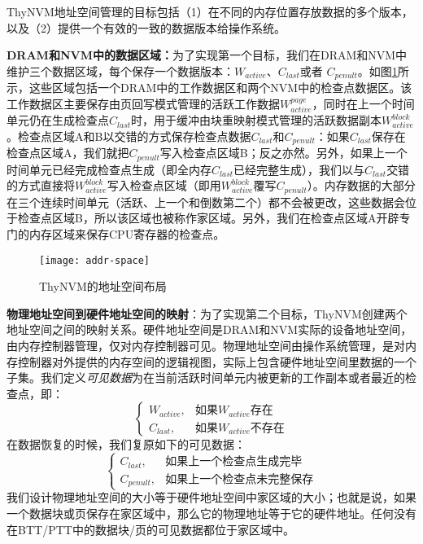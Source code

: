 ThyNVM地址空间管理的目标包括（1）在不同的内存位置存放数据的多个版本，以及（2）提供一个有效的一致的数据版本给操作系统。

\textbf{DRAM和NVM中的数据区域：}为了实现第一个目标，我们在DRAM和NVM中维护三个数据区域，每个保存一个数据版本：$W_{active}$、$C_{last}$或者 $C_{penult}$。如图\ref{fig-addr-space}所示，这些区域包括一个DRAM中的工作数据区和两个NVM中的检查点数据区。该工作数据区主要保存由页回写模式管理的活跃工作数据$W^{page}_{active}$，同时在上一个时间单元仍在生成检查点$C_{last}$时，用于缓冲由块重映射模式管理的活跃数据副本$W^{block}_{active}$。检查点区域A和B以交错的方式保存检查点数据$C_{last}$和$C_{penult}$：如果$C_{last}$保存在检查点区域A，我们就把$C_{penult}$写入检查点区域B；反之亦然。另外，如果上一个时间单元已经完成检查点生成（即全内存$C_{last}$已经完整生成），我们以与$C_{last}$交错的方式直接将$W^{block}_{active}$写入检查点区域（即用$W^{block}_{active}$覆写$C_{penult}$）。内存数据的大部分在三个连续时间单元（活跃、上一个和倒数第二个）都不会被更改，这些数据会位于检查点区域B，所以该区域也被称作家区域。另外，我们在检查点区域A开辟专门的内存区域来保存CPU寄存器的检查点。 

\begin{figure}[!h]
\centering
\texttt{[image: addr-space]}
\caption{ThyNVM的地址空间布局}
\label{fig-addr-space}
\end{figure}

\textbf{物理地址空间到硬件地址空间的映射}：为了实现第二个目标，ThyNVM创建两个地址空间之间的映射关系。硬件地址空间是DRAM和NVM实际的设备地址空间，由内存控制器管理，仅对内存控制器可见。物理地址空间由操作系统管理，是对内存控制器对外提供的内存空间的逻辑视图，实际上包含硬件地址空间里数据的一个子集。我们定义\emph{可见数据}为在当前活跃时间单元内被更新的工作副本或者最近的检查点，即： 
\[
\begin{cases}
        W_{active}, & \text{如果}W_{active}\text{存在}\\
        C_{last}, & \text{如果}W_{active}\text{不存在}
\end{cases}
\]
在数据恢复的时候，我们复原如下的可见数据： 
\[
\begin{cases}
        C_{last}, & \text{如果上一个检查点生成完毕}\\
        C_{penult}, & \text{如果上一个检查点未完整保存}
\end{cases}
\]
我们设计物理地址空间的大小等于硬件地址空间中家区域的大小；也就是说，如果一个数据块或页保存在家区域中，那么它的物理地址等于它的硬件地址。任何没有在BTT/PTT中的数据块/页的可见数据都位于家区域中。

